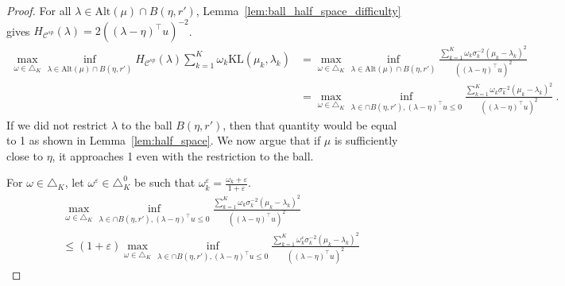\documentclass{article}
\newcommand{\KL}{\mathrm{KL}}
\newcommand{\alt}{\mathrm{Alt}}
\begin{document}
\begin{proof}
For all $\lambda \in \alt(\mu) \cap B(\eta, r')$, Lemma~\ref{lem:ball_half_space_difficulty} gives $H_{\mathcal C^{sp}}(\lambda) = 2 ((\lambda - \eta)^\top u)^{-2}$.
\begin{align*}
\max_{\omega \in \triangle_K} \inf_{\lambda \in \alt(\mu) \cap B(\eta, r')}
  H_{\mathcal C^{sp}}(\lambda) \sum_{k=1}^K \omega_{k} \KL(\mu_k, \lambda_k)
&= \max_{\omega \in \triangle_K} \inf_{\lambda \in \alt(\mu) \cap B(\eta, r')}
  \frac{\sum_{k=1}^K \omega_{k} \sigma_k^{-2} (\mu_k - \lambda_k)^2}{((\lambda - \eta)^\top u)^2}
\\
&= \max_{\omega \in \triangle_K} \inf_{\lambda \in \cap B(\eta, r'), (\lambda - \eta)^\top u \le 0}
  \frac{\sum_{k=1}^K \omega_{k} \sigma_k^{-2} (\mu_k - \lambda_k)^2}{((\lambda - \eta)^\top u)^2}
\: .
\end{align*}
If we did not restrict $\lambda$ to the ball $B(\eta, r')$, then that quantity would be equal to 1 as shown in Lemma~\ref{lem:half_space}. We now argue that if $\mu$ is sufficiently close to $\eta$, it approaches 1 even with the restriction to the ball.

For $\omega \in \triangle_K$, let $\omega^\varepsilon \in \triangle_K^0$ be such that $\omega_k^\varepsilon = \frac{\omega_k + \varepsilon}{1 + \varepsilon}$.
\begin{align*}
&\max_{\omega \in \triangle_K} \inf_{\lambda \in \cap B(\eta, r'), (\lambda - \eta)^\top u \le 0}
  \frac{\sum_{k=1}^K \omega_{k} \sigma_k^{-2} (\mu_k - \lambda_k)^2}{((\lambda - \eta)^\top u)^2}
\\
&\le (1 + \varepsilon) \max_{\omega \in \triangle_K} \inf_{\lambda \in \cap B(\eta, r'), (\lambda - \eta)^\top u \le 0}
  \frac{\sum_{k=1}^K \omega_{k}^\varepsilon \sigma_k^{-2} (\mu_k - \lambda_k)^2}{((\lambda - \eta)^\top u)^2}
\end{align*}


\end{proof}
\end{document}
